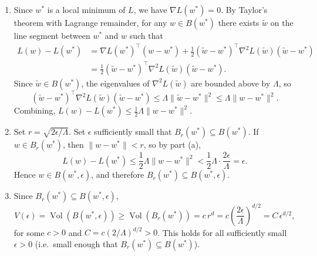 \documentclass[11pt]{article}
\begin{document}
\begin{solution}
\begin{enumerate}
    \item 
        Since $w^*$ is a local minimum of $L$, we have $\nabla L(w^*) = 0$. By Taylor's theorem with Lagrange remainder, for any $w \in B(w^*)$ there exists $\tilde{w}$ on the line segment between $w^*$ and $w$ such that
        \begin{align*}
            L(w) - L(w^*) 
            &= \nabla L(w^*)^\top (w - w^*) + \frac{1}{2}(\tilde w - w^*)^\top \nabla^2 L(\tilde{w})(\tilde w - w^*)
            \\&= \frac{1}{2}(\tilde w - w^*)^\top \nabla^2 L(\tilde{w})(\tilde w - w^*).
        \end{align*}
        Since $\tilde{w} \in B(w^*)$, the eigenvalues of $\nabla^2 L(\tilde{w})$ are bounded above by $\Lambda$, so
        \begin{equation*}
            (\tilde w - w^*)^\top \nabla^2 L(\tilde{w})(\tilde w - w^*)
            \leq \Lambda \|\tilde w - w^*\|^2
            \leq \Lambda \|w - w^*\|^2.
        \end{equation*}
        Combining, $L(w) - L(w^*) \leq \frac{1}{2}\Lambda \|w - w^*\|^2$.

    \item 
        Set $r = \sqrt{2\epsilon/\Lambda}$. Set $\epsilon$ sufficiently small that $B_r(w^*) \subseteq B(w^*)$.
        If $w \in B_r(w^*)$, then $\|w - w^*\| < r$, so by part (a),
        \begin{equation*}
            L(w) - L(w^*) \leq \frac{1}{2}\Lambda \|w - w^*\|^2 < \frac{1}{2}\Lambda \cdot \frac{2\epsilon}{\Lambda} = \epsilon.
        \end{equation*}
        Hence $w \in B(w^*, \epsilon)$, and therefore $B_r(w^*) \subseteq B(w^*, \epsilon)$.

    \item 
        Since $B_r(w^*) \subseteq B(w^*, \epsilon)$, 
        \begin{equation*}
            V(\epsilon) 
            = \operatorname{Vol}(B(w^*, \epsilon)) 
            \geq \operatorname{Vol}(B_r(w^*)) 
            = c \, r^d 
            = c \left(\frac{2\epsilon}{\Lambda}\right)^{d/2} 
            = C \, \epsilon^{d/2},
        \end{equation*}
        for some $c >0$ and $C = c (2/\Lambda)^{d/2} > 0$. This holds for all sufficiently small $\epsilon > 0$ (i.e.\ small enough that $B_r(w^*) \subseteq B(w^*)$).


\end{enumerate}
\end{solution}
\end{document}
